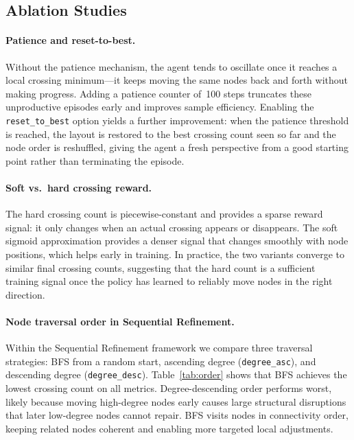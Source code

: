 \documentclass[10pt,twocolumn]{article}
\begin{document}
\subsection{Ablation Studies}

\paragraph{Patience and reset-to-best.}
Without the patience mechanism, the agent tends to oscillate once it reaches
a local crossing minimum---it keeps moving the same nodes back and forth
without making progress.  Adding a patience counter of~100 steps truncates
these unproductive episodes early and improves sample efficiency.  Enabling
the \texttt{reset\_to\_best} option yields a further improvement: when the
patience threshold is reached, the layout is restored to the best crossing
count seen so far and the node order is reshuffled, giving the agent a fresh
perspective from a good starting point rather than terminating the episode.

\paragraph{Soft vs.\ hard crossing reward.}
The hard crossing count is piecewise-constant and provides a sparse reward
signal: it only changes when an actual crossing appears or disappears.  The
soft sigmoid approximation provides a denser signal that changes smoothly
with node positions, which helps early in training.  In practice, the two
variants converge to similar final crossing counts, suggesting that the hard
count is a sufficient training signal once the policy has learned to reliably
move nodes in the right direction.

\paragraph{Node traversal order in Sequential Refinement.}
Within the Sequential Refinement framework we compare three traversal
strategies: BFS from a random start, ascending degree (\texttt{degree\_asc}),
and descending degree (\texttt{degree\_desc}).  Table~\ref{tab:order} shows
that BFS achieves the lowest crossing count on all metrics.  Degree-descending
order performs worst, likely because moving high-degree nodes early causes
large structural disruptions that later low-degree nodes cannot repair.
BFS visits nodes in connectivity order, keeping related nodes coherent and
enabling more targeted local adjustments.
\end{document}

